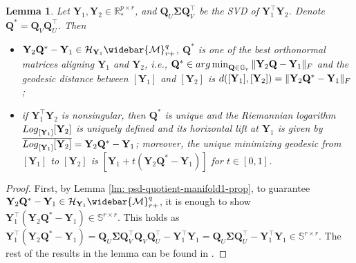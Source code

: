 \documentclass[11pt]{article}
\newtheorem{Lemma}{Lemma}
\newcommand{\bbR}{\mathbb{R}}
\newcommand{\bbS}{\mathbb{S}}
\newcommand{\cH}{\mathcal{H}}
\newcommand{\0}{{\mathbf{0}}}
\newcommand{\1}{{\mathbf{1}}}
\newcommand{\Q}{{\mathbf{Q}}}
\newcommand{\Y}{{\mathbf{Y}}}
\newcommand{\cM}{{\cal M}}
\newcommand{\bSigma}{\boldsymbol{\Sigma}}
\newcommand{\F}{{\rm F}}
\renewcommand{\log}{{\rm Log}}
\newcommand{\argmin}{\mathop{\rm arg\min}}
\newcommand{\bbO}{\mathbb{O}}
\begin{document}
\begin{Lemma} \label{lm: logarithm-map} Let $\Y_1, \Y_2 \in \bbR^{p \times r}_*$, and $\Q_U \bSigma \Q_V^\top$ be the SVD of $\Y_1^\top \Y_2$. Denote $\Q^* = \Q_V \Q_U^\top$. Then
\begin{itemize}
	\item  $\Y_2 \Q^* - \Y_1 \in \cH_{\Y_1}\widebar{\cM}_{r+}^{q}$, $\Q^*$ is one of the best orthonormal matrices aligning $\Y_1$ and $\Y_2$, i.e., $\Q^* \in \argmin_{\Q \in \bbO_r} \|\Y_2 \Q - \Y_1\|_\F$ and the geodesic distance between $[\Y_1]$ and $[\Y_2]$ is $d([\Y_1], [\Y_2]) = \|\Y_2 \Q^* - \Y_1\|_\F$;
	\item if $\Y_1^\top \Y_2$ is nonsingular, then $\Q^*$ is unique and the Riemannian logarithm $\log_{[\Y_1]}[\Y_2]$ is uniquely defined and its horizontal lift at $\Y_1$ is given by $\overline{\log_{[\Y_1]}[\Y_2]} = \Y_2 \Q^* - \Y_1$; moreover, the unique minimizing geodesic from $[\Y_1]$ to $[\Y_2]$ is $[\Y_1 + t(\Y_2 \Q^* - \Y_1)]$ for $t \in [0,1]$.
\end{itemize}
\end{Lemma}
\begin{proof}
	First, by Lemma \ref{lm: psd-quotient-manifold1-prop}, to guarantee $\Y_2 \Q^* - \Y_1 \in \cH_{\Y_1}\widebar{\cM}_{r+}^{q}$, it is enough to show $\Y_1^\top (\Y_2 \Q^* - \Y_1) \in \bbS^{r \times r} $. This holds as $\Y_1^\top (\Y_2 \Q^* - \Y_1) = \Q_U \bSigma \Q_V^\top \Q_V \Q_U^\top - \Y_1^\top \Y_1 = \Q_U \bSigma \Q_U^\top - \Y_1^\top \Y_1 \in \bbS^{r \times r}$. The rest of the results in the lemma can be found in \cite[Proposition 5.1, Theorem 4.7 and Proposition 4.4]{massart2020quotient}.
\end{proof}
\end{document}

